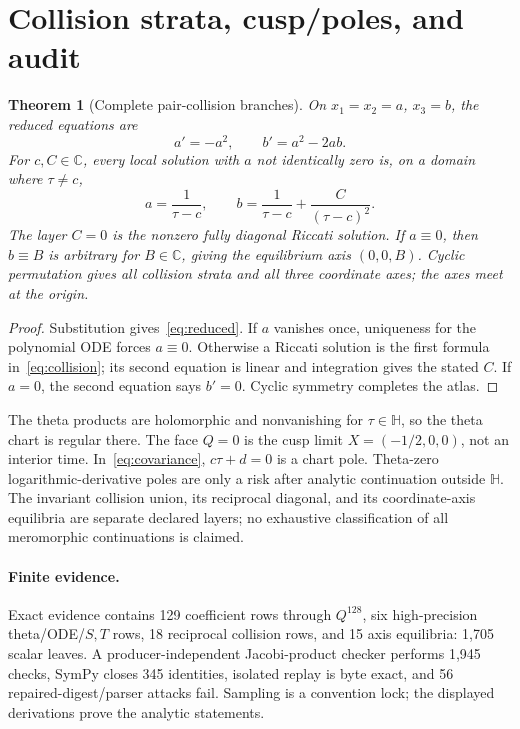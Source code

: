 \documentclass[10pt]{article}
\newtheorem{theorem}{Theorem}
\newcommand{\CC}{\mathbb C}
\newcommand{\HH}{\mathbb H}
\begin{document}
\section{Collision strata, cusp/poles, and audit}
\begin{theorem}[Complete pair-collision branches]\label{thm:collision}
On $x_1=x_2=a$, $x_3=b$, the reduced equations are
\begin{equation}\label{eq:reduced}
 a'=-a^2,\qquad b'=a^2-2ab.
\end{equation}
For $c,C\in\CC$, every local solution with $a$ not identically zero is,
on a domain where $\tau\ne c$,
\begin{equation}\label{eq:collision}
 a=\frac1{\tau-c},\qquad
 b=\frac1{\tau-c}+\frac C{(\tau-c)^2}.
\end{equation}
The layer $C=0$ is the nonzero fully diagonal Riccati solution.  If
$a\equiv0$, then $b\equiv B$ is arbitrary for $B\in\CC$, giving the equilibrium axis
$(0,0,B)$.  Cyclic permutation gives all collision strata and all three
coordinate axes; the axes meet at the origin.
\end{theorem}
\begin{proof}
Substitution gives~\eqref{eq:reduced}.  If $a$ vanishes once, uniqueness for
the polynomial ODE forces $a\equiv0$.  Otherwise a Riccati solution is the
first formula in~\eqref{eq:collision}; its second equation is linear and
integration gives the stated $C$.  If $a=0$, the second equation says
$b'=0$.  Cyclic symmetry completes the atlas.
\end{proof}

The theta products are holomorphic and nonvanishing for $\tau\in\HH$, so
the theta chart is regular there.  The face $Q=0$ is the cusp
limit $X=(-1/2,0,0)$, not an interior time.  In~\eqref{eq:covariance},
$c\tau+d=0$ is a chart pole.  Theta-zero logarithmic-derivative poles are
only a risk after analytic continuation outside $\HH$.  The invariant collision union, its reciprocal
diagonal, and its coordinate-axis equilibria are separate declared layers;
no exhaustive classification of all meromorphic continuations is claimed.

\paragraph{Finite evidence.}
Exact evidence contains 129 coefficient rows through $Q^{128}$, six
high-precision theta/ODE/$S,T$ rows, 18 reciprocal collision rows, and 15
axis equilibria: 1,705 scalar leaves.  A producer-independent Jacobi-product
checker performs 1,945 checks, SymPy closes 345 identities, isolated replay
is byte exact, and 56 repaired-digest/parser attacks fail.  Sampling is a
convention lock; the displayed derivations prove the analytic statements.
\end{document}
